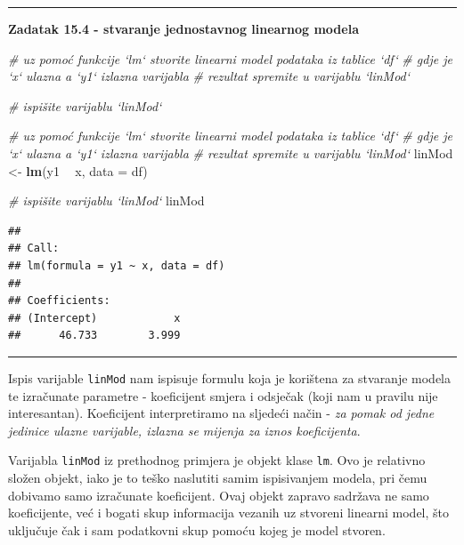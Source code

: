 \documentclass[]{book}
\newenvironment{Shaded}{\begin{snugshade}}{\end{snugshade}}
\newcommand{\KeywordTok}[1]{\textcolor[rgb]{0.13,0.29,0.53}{\textbf{#1}}}
\newcommand{\DataTypeTok}[1]{\textcolor[rgb]{0.13,0.29,0.53}{#1}}
\newcommand{\StringTok}[1]{\textcolor[rgb]{0.31,0.60,0.02}{#1}}
\newcommand{\CommentTok}[1]{\textcolor[rgb]{0.56,0.35,0.01}{\textit{#1}}}
\newcommand{\OperatorTok}[1]{\textcolor[rgb]{0.81,0.36,0.00}{\textbf{#1}}}
\newcommand{\NormalTok}[1]{#1}
\theoremstyle{definition}
\theoremstyle{definition}
\theoremstyle{definition}
\theoremstyle{remark}
\begin{document}
\begin{center}\rule{0.5\linewidth}{\linethickness}\end{center}

\textbf{Zadatak 15.4 - stvaranje jednostavnog linearnog modela}

\begin{Shaded}
\begin{Highlighting}[]
\CommentTok{# uz pomoć funkcije `lm` stvorite linearni model podataka iz tablice `df`}
\CommentTok{# gdje je `x` ulazna a `y1` izlazna varijabla}
\CommentTok{# rezultat spremite u varijablu `linMod`}


\CommentTok{# ispišite varijablu `linMod`}
\end{Highlighting}
\end{Shaded}

\begin{Shaded}
\begin{Highlighting}[]
\CommentTok{# uz pomoć funkcije `lm` stvorite linearni model podataka iz tablice `df`}
\CommentTok{# gdje je `x` ulazna a `y1` izlazna varijabla}
\CommentTok{# rezultat spremite u varijablu `linMod`}
\NormalTok{linMod <-}\StringTok{ }\KeywordTok{lm}\NormalTok{(y1 }\OperatorTok{~}\StringTok{ }\NormalTok{x, }\DataTypeTok{data =}\NormalTok{ df)}

\CommentTok{# ispišite varijablu `linMod`}
\NormalTok{linMod}
\end{Highlighting}
\end{Shaded}

\begin{verbatim}
## 
## Call:
## lm(formula = y1 ~ x, data = df)
## 
## Coefficients:
## (Intercept)            x  
##      46.733        3.999
\end{verbatim}

\begin{center}\rule{0.5\linewidth}{\linethickness}\end{center}

Ispis varijable \texttt{linMod} nam ispisuje formulu koja je korištena
za stvaranje modela te izračunate parametre - koeficijent smjera i
odsječak (koji nam u pravilu nije interesantan). Koeficijent
interpretiramo na sljedeći način - \emph{za pomak od jedne jedinice
ulazne varijable, izlazna se mijenja za iznos koeficijenta}.

Varijabla \texttt{linMod} iz prethodnog primjera je objekt klase
\texttt{lm}. Ovo je relativno složen objekt, iako je to teško naslutiti
samim ispisivanjem modela, pri čemu dobivamo samo izračunate
koeficijent. Ovaj objekt zapravo sadržava ne samo koeficijente, već i
bogati skup informacija vezanih uz stvoreni linearni model, što
uključuje čak i sam podatkovni skup pomoću kojeg je model stvoren.
\end{document}
